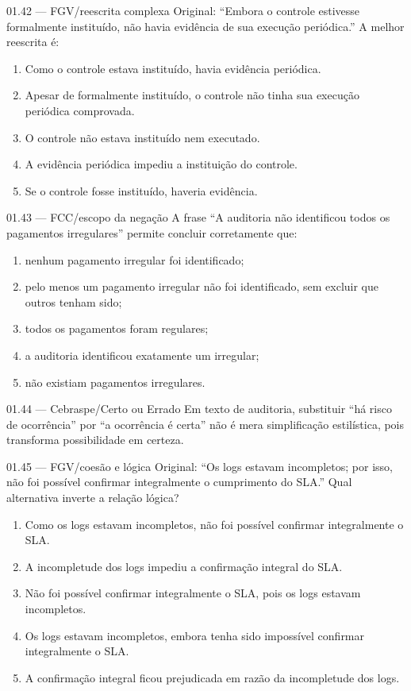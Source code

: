 \begin{questao}{ 01.42 — FGV/reescrita complexa}
Original: ``Embora o controle estivesse formalmente instituído, não havia evidência de sua execução periódica.'' A melhor reescrita é:
\begin{enumerate}[label=\Alph*)]
\item Como o controle estava instituído, havia evidência periódica.
\item Apesar de formalmente instituído, o controle não tinha sua execução periódica comprovada.
\item O controle não estava instituído nem executado.
\item A evidência periódica impediu a instituição do controle.
\item Se o controle fosse instituído, haveria evidência.
\end{enumerate}
\end{questao}

\begin{questao}{ 01.43 — FCC/escopo da negação}
A frase ``A auditoria não identificou todos os pagamentos irregulares'' permite concluir corretamente que:
\begin{enumerate}[label=\Alph*)]
\item nenhum pagamento irregular foi identificado;
\item pelo menos um pagamento irregular não foi identificado, sem excluir que outros tenham sido;
\item todos os pagamentos foram regulares;
\item a auditoria identificou exatamente um irregular;
\item não existiam pagamentos irregulares.
\end{enumerate}
\end{questao}

\begin{questao}{ 01.44 — Cebraspe/Certo ou Errado}
Em texto de auditoria, substituir ``há risco de ocorrência'' por ``a ocorrência é certa'' não é mera simplificação estilística, pois transforma possibilidade em certeza.
\end{questao}

\begin{questao}{ 01.45 — FGV/coesão e lógica}
Original: ``Os logs estavam incompletos; por isso, não foi possível confirmar integralmente o cumprimento do SLA.'' Qual alternativa inverte a relação lógica?
\begin{enumerate}[label=\Alph*)]
\item Como os logs estavam incompletos, não foi possível confirmar integralmente o SLA.
\item A incompletude dos logs impediu a confirmação integral do SLA.
\item Não foi possível confirmar integralmente o SLA, pois os logs estavam incompletos.
\item Os logs estavam incompletos, embora tenha sido impossível confirmar integralmente o SLA.
\item A confirmação integral ficou prejudicada em razão da incompletude dos logs.
\end{enumerate}
\end{questao}

